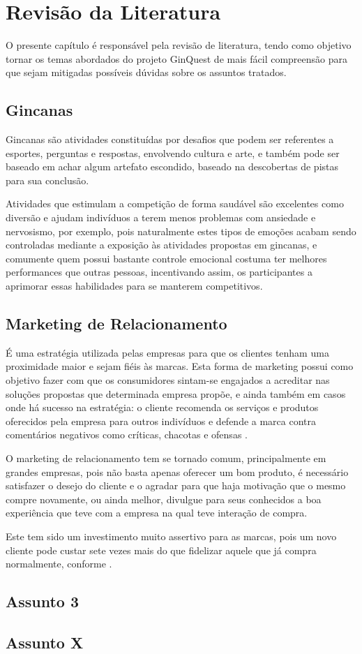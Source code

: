 \chapter{Revisão da Literatura}
O presente capítulo é responsável pela revisão de literatura, tendo como objetivo tornar os temas abordados do projeto GinQuest de mais fácil compreensão para que sejam mitigadas possíveis dúvidas sobre os assuntos tratados.\

\section{Gincanas}
Gincanas são atividades constituídas por desafios que podem ser referentes a esportes, perguntas e respostas, envolvendo cultura e arte, e também pode ser baseado em achar algum artefato escondido, baseado na descobertas de pistas para sua conclusão.

Atividades que estimulam a competição de forma saudável são excelentes como diversão e ajudam indivíduos a terem menos problemas com ansiedade e nervosismo, por exemplo, pois naturalmente estes tipos de emoções acabam sendo controladas mediante a exposição às atividades propostas em gincanas, e comumente quem possui bastante controle emocional costuma ter melhores performances que outras pessoas, incentivando assim, os participantes a aprimorar essas habilidades para se manterem competitivos.

\section{Marketing de Relacionamento}
É uma estratégia utilizada pelas empresas para que os clientes tenham uma proximidade maior e sejam fiéis às marcas. Esta forma de marketing possui como objetivo fazer com que os consumidores sintam-se engajados a acreditar nas soluções propostas que determinada empresa propõe, e ainda também em casos onde há sucesso na estratégia: o cliente recomenda os serviços e produtos oferecidos pela empresa para outros indivíduos e defende a marca contra comentários negativos como críticas, chacotas e ofensas .

O marketing de relacionamento tem se tornado comum, principalmente em grandes empresas, pois não basta apenas oferecer um bom produto, é necessário satisfazer o desejo do cliente e o agradar para que haja motivação que o mesmo compre novamente, ou ainda melhor, divulgue para seus conhecidos a boa experiência que teve com a empresa na qual teve interação de compra.

Este tem sido um investimento muito assertivo para as marcas, pois um novo cliente pode custar sete vezes mais do que fidelizar aquele que já compra normalmente, conforme .

\section{Assunto 3}
\lipsum[3-5]
\section{Assunto X}
\lipsum[2-4]
